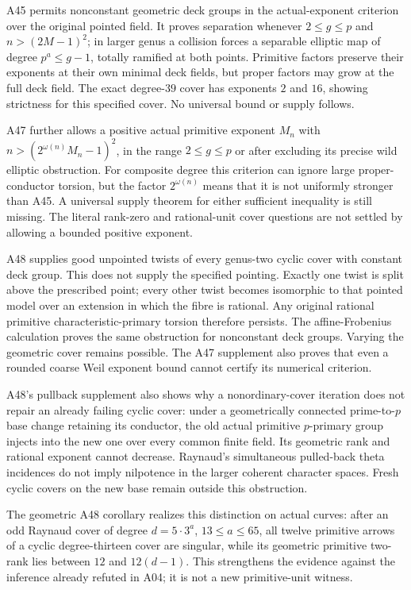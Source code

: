 A45 permits nonconstant geometric deck groups in the actual-exponent
criterion over the original pointed field. It proves separation whenever
$2\le g\le p$ and $n>(2M-1)^2$; in larger genus a collision forces a
separable elliptic map of degree $p^a\le g-1$, totally ramified at both
points. Primitive factors preserve their exponents at their own minimal
deck fields, but proper factors may grow at the full deck field. The
exact degree-$39$ cover has exponents $2$ and $16$, showing strictness
for this specified cover. No universal bound or supply follows.

A47 further allows a positive actual primitive exponent $M_n$ with
$n>(2^{\omega(n)}M_n-1)^2$, in the range $2\le g\le p$ or after
excluding its precise wild elliptic obstruction. For composite degree
this criterion can ignore large proper-conductor torsion, but the factor
$2^{\omega(n)}$ means that it is not uniformly stronger than A45.
A universal supply theorem for either sufficient inequality is still
missing. The literal rank-zero and rational-unit cover questions are
not settled by allowing a bounded positive exponent.

A48 supplies good unpointed twists of every genus-two cyclic cover
with constant deck group. This does not supply the specified pointing.
Exactly one twist is split above the prescribed point; every other twist
becomes isomorphic to that pointed model over an extension in which the
fibre is rational. Any original rational primitive characteristic-primary
torsion therefore persists. The affine-Frobenius calculation proves the
same obstruction for nonconstant deck groups. Varying the geometric cover
remains possible. The A47 supplement also proves that even a rounded
coarse Weil exponent bound cannot certify its numerical criterion.

A48's pullback supplement also shows why a nonordinary-cover iteration
does not repair an already failing cyclic cover: under a geometrically
connected prime-to-$p$ base change retaining its conductor, the old actual
primitive $p$-primary group injects into the new one over every common
finite field. Its geometric rank and rational exponent cannot decrease.
Raynaud's simultaneous pulled-back theta incidences do not imply
nilpotence in the larger coherent character spaces. Fresh cyclic covers
on the new base remain outside this obstruction.

The geometric A48 corollary realizes this distinction on actual curves:
after an odd Raynaud cover of degree $d=5\cdot3^a$, $13\le a\le65$,
all twelve primitive arrows of a cyclic degree-thirteen cover are singular,
while its geometric primitive two-rank lies between $12$ and $12(d-1)$.
This strengthens the evidence against the inference already refuted in A04;
it is not a new primitive-unit witness.

